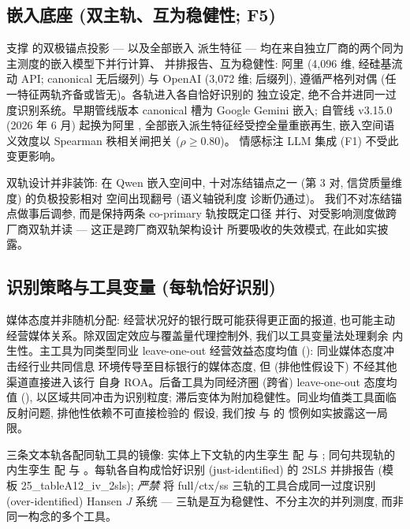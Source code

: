\subsection{嵌入底座 (双主轨、互为稳健性; F5)}
支撑  的双极锚点投影 --- 以及全部嵌入
派生特征 --- 均在来自独立厂商的两个同为主测度的嵌入模型下并行计算、
并排报告、互为稳健性: 阿里  (4{,}096 维,
经硅基流动 API; canonical 无后缀列) 与 OpenAI
 (3{,}072 维;  后缀列),
遵循严格列对偶 (任一特征两轨齐备或皆无)。各轨进入各自恰好识别的
独立设定, 绝不合并进同一过度识别系统。早期管线版本 canonical 槽为
Google Gemini 嵌入; 自管线 v3.15.0 (2026 年 6 月) 起换为阿里
, 全部嵌入派生特征经受控全量重嵌再生,
嵌入空间语义效度以 Spearman 秩相关闸把关 ($\rho \geq 0.80$)。
情感标注 LLM 集成 (F1) 不受此变更影响。

双轨设计并非装饰: 在 Qwen 嵌入空间中, 十对冻结锚点之一 (第 3 对,
信贷质量维度) 的负极投影相对  空间出现翻号 (语义轴锐利度
诊断仍通过)。
我们不对冻结锚点做事后调参, 而是保持两条 co-primary 轨按既定口径
并行、对受影响测度做跨厂商双轨并读 --- 这正是跨厂商双轨架构设计
所要吸收的失效模式, 在此如实披露。

\subsection{识别策略与工具变量 (每轨恰好识别)}\label{sec:method:iv}
媒体态度并非随机分配: 经营状况好的银行既可能获得更正面的报道, 也可能主动
经营媒体关系。除双固定效应与覆盖量代理控制外, 我们以工具变量法处理剩余
内生性。主工具为同类型同业 leave-one-out 经营效益态度均值
(): 同业媒体态度冲击经行业共同信息
环境传导至目标银行的媒体态度, 但 (排他性假设下) 不经其他渠道直接进入该行
自身 ROA。后备工具为同经济圈 (跨省) leave-one-out 态度均值
(), 以区域共同冲击为识别粒度; 
滞后变体为附加稳健性。同业均值类工具面临反射问题, 排他性依赖不可直接检验的
假设, 我们按 \textcite{manski1993reflection} 与 \textcite{leary2014peer} 的
惯例如实披露这一局限。

三条文本轨各配同轨工具的镜像: 实体上下文轨的内生孪生 
配  与 ;
同句共现轨的内生孪生  配 
与 。每轨各自构成恰好识别
(just-identified) 的 2SLS 并排报告 (模板 25\_tableA12\_iv\_2sls); \emph{严禁}
将 full/ctx/ss 三轨的工具合成同一过度识别 (over-identified) Hansen $J$ 系统
--- 三轨是互为稳健性、不分主次的并列测度, 而非同一构念的多个工具。

